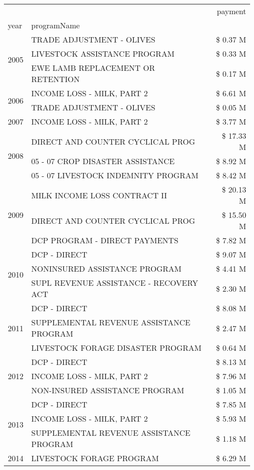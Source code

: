 \begin{tabular}{llr}
\toprule
 &  & payment \\
year & programName &  \\
\midrule
\multirow[t]{3}{*}{2005} & TRADE ADJUSTMENT - OLIVES & \$ 0.37 M \\
 & LIVESTOCK ASSISTANCE PROGRAM & \$ 0.33 M \\
 & EWE LAMB REPLACEMENT OR RETENTION & \$ 0.17 M \\
\cline{1-3}
\multirow[t]{2}{*}{2006} & INCOME LOSS - MILK, PART 2 & \$ 6.61 M \\
 & TRADE ADJUSTMENT - OLIVES & \$ 0.05 M \\
\cline{1-3}
2007 & INCOME LOSS - MILK, PART 2 & \$ 3.77 M \\
\cline{1-3}
\multirow[t]{3}{*}{2008} & DIRECT AND COUNTER CYCLICAL PROG & \$ 17.33 M \\
 & 05 - 07 CROP DISASTER ASSISTANCE & \$ 8.92 M \\
 & 05 - 07 LIVESTOCK INDEMNITY PROGRAM & \$ 8.42 M \\
\cline{1-3}
\multirow[t]{3}{*}{2009} & MILK INCOME LOSS CONTRACT II & \$ 20.13 M \\
 & DIRECT AND COUNTER CYCLICAL PROG & \$ 15.50 M \\
 & DCP PROGRAM - DIRECT PAYMENTS & \$ 7.82 M \\
\cline{1-3}
\multirow[t]{3}{*}{2010} & DCP - DIRECT & \$ 9.07 M \\
 & NONINSURED ASSISTANCE PROGRAM & \$ 4.41 M \\
 & SUPL REVENUE ASSISTANCE - RECOVERY ACT & \$ 2.30 M \\
\cline{1-3}
\multirow[t]{3}{*}{2011} & DCP - DIRECT & \$ 8.08 M \\
 & SUPPLEMENTAL REVENUE ASSISTANCE PROGRAM & \$ 2.47 M \\
 & LIVESTOCK FORAGE DISASTER PROGRAM & \$ 0.64 M \\
\cline{1-3}
\multirow[t]{3}{*}{2012} & DCP - DIRECT & \$ 8.13 M \\
 & INCOME LOSS - MILK, PART 2 & \$ 7.96 M \\
 & NON-INSURED ASSISTANCE PROGRAM & \$ 1.05 M \\
\cline{1-3}
\multirow[t]{3}{*}{2013} & DCP - DIRECT & \$ 7.85 M \\
 & INCOME LOSS - MILK, PART 2 & \$ 5.93 M \\
 & SUPPLEMENTAL REVENUE ASSISTANCE PROGRAM & \$ 1.18 M \\
\cline{1-3}
\multirow[t]{3}{*}{2014} & LIVESTOCK FORAGE PROGRAM & \$ 6.29 M \\

\end{tabular}
